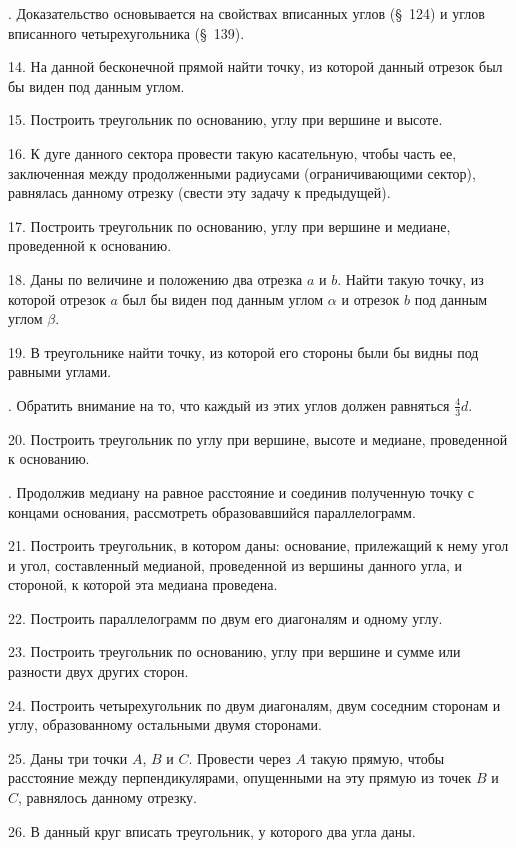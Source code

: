 \documentclass[oneside]{book}
\begin{document}
.
Доказательство основывается на свойствах вписанных углов (§~124) и углов вписанного четырехугольника (§~139).



14.
На данной бесконечной прямой найти точку, из которой данный отрезок был бы виден под данным углом.

15.
Построить треугольник по основанию, углу при вершине и высоте.

16.
К дуге данного сектора провести такую касательную, чтобы часть ее, заключенная между продолженными радиусами (ограничивающими сектор), равнялась данному отрезку (свести эту задачу к предыдущей).

17.
Построить треугольник по основанию, углу при вершине и медиане, проведенной к основанию.

18.
Даны по величине и положению два отрезка $a$ и $b$.
Найти такую точку, из которой отрезок $a$ был бы виден под данным углом $\alpha$ и отрезок $b$ под данным углом $\beta$.

19.
В треугольнике найти точку, из которой его стороны были бы видны под равными углами.

.
Обратить внимание на то, что каждый из этих углов должен равняться $\tfrac43d$.

20.
Построить треугольник по углу при вершине, высоте и медиане, проведенной к основанию.

.
Продолжив медиану на равное расстояние и соединив полученную точку с концами основания, рассмотреть образовавшийся параллелограмм.

21.
Построить треугольник, в котором даны:
основание, прилежащий к нему угол и угол, составленный медианой, проведенной из вершины данного угла, и стороной, к которой эта медиана проведена.

22.
Построить параллелограмм по двум его диагоналям и одному углу.

23.
Построить треугольник по основанию, углу при вершине и сумме или разности двух других сторон.

24.
Построить четырехугольник по двум диагоналям, двум соседним сторонам и углу, образованному остальными двумя сторонами.

25.
Даны три точки $A$, $B$ и $C$.
Провести через $A$ такую прямую, чтобы расстояние между перпендикулярами, опущенными на эту прямую из точек $B$ и $C$, равнялось данному отрезку.

26.
В данный круг вписать треугольник, у которого два угла даны.
\end{document}
